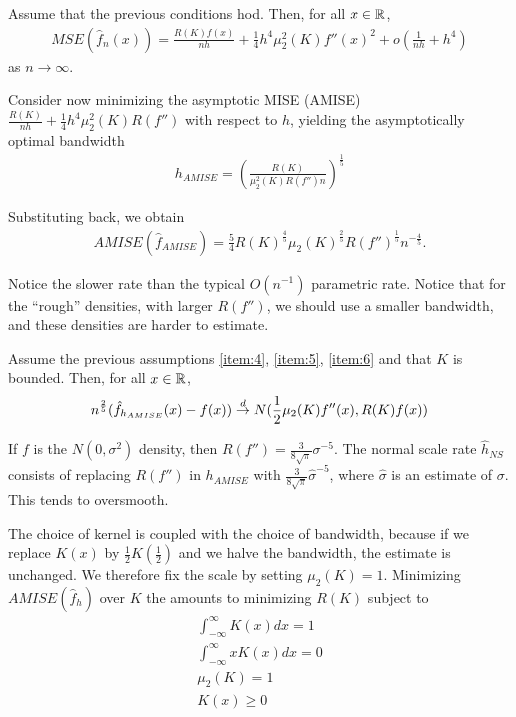 \begin{thm}
  \label{defn:Introduction:3}
  Assume that the previous conditions hod. Then, for all $x \in \mathbb{R}$,
  \begin{align}
    \label{eq:15}
    MSE(\hat f_{n}(x)) = \frac{R(K) f(x)}{nh} + \frac{1}{4} h^{4}
    \mu_{2}^{2}(K) f''(x)^{2} + o(\frac{1}{nh} + h^{4})
  \end{align} as $n \rightarrow \infty$.
\end{thm}


Consider now minimizing the asymptotic MISE (AMISE) $\frac{R(K)}{nh} +
\frac{1}{4} h^{4} \mu_{2}^{2}(K) R(f'')$ with respect to $h$, yielding
the asymptotically optimal bandwidth
\begin{align}
  \label{eq:24}
  h_{AMISE} = (\frac{R(K)}{\mu_{2}^{2}(K) R(f'') n})^{\frac{1}{5}}
\end{align}

Substituting back, we obtain
\begin{align}
  \label{eq:25}
  AMISE(\hat f_{AMISE}) = \frac{5}{4} R(K)^{\frac{4}{5}}
  \mu_{2}(K)^{\frac{2}{5}} R(f'')^{\frac{1}{5}} n^{-\frac{4}{5}}.
\end{align}

Notice the slower rate than the typical $O(n^{-1})$
parametric rate.  Notice that for the ``rough'' densities, with larger
$R(f'')$, we should use a smaller bandwidth, and these densities are
harder to estimate.

\begin{thm}
  \label{defn:Introduction:4}
  Assume the previous assumptions \ref{item:4}, \ref{item:5},
  \ref{item:6} and that $K$ is bounded.  Then, for all $x \in \mathbb{R}$,
  \begin{equation}
    \label{eq:26}
    n^{\frac{2}{5}}(\hat f_{h_{AMISE}}(x) - f(x)) \overset{d}{\rightarrow}
    N(\frac{1}{2}\mu_{2}(K) f''(x), R(K) f(x))
  \end{equation}
\end{thm}

\begin{thm}
  If $f$ is the $N(0, \sigma^{2})$ density, then $R(f'') = \frac{3}{8
    \sqrt{\pi}} \sigma^{-5}$. The normal scale rate $\hat h_{NS}$
  consists of replacing $R(f'')$ in $h_{AMISE}$ with $\frac{3}{8
    \sqrt{\pi}} \hat \sigma^{-5}$, where $\hat \sigma$ is an estimate
  of $\sigma$. This tends to oversmooth.
\end{thm}

The choice of kernel is coupled with the choice of bandwidth, because
if we replace $K(x)$ by $\frac{1}{2} K(\frac{1}{2})$ and we halve the
bandwidth, the estimate is unchanged.  We therefore fix the scale by
setting $\mu_{2}(K) = 1$.  Minimizing $AMISE(\hat f_{h})$ over $K$ the
amounts to minimizing $R(K)$ subject to
\begin{align}
  \label{eq:40}
  \int_{-\infty}^{\infty} K(x) dx = 1 \\
  \int_{-\infty}^{\infty} x K(x) dx = 0 \\
  \mu_{2}(K) = 1 \\
  K(x) \geq 0
\end{align}

